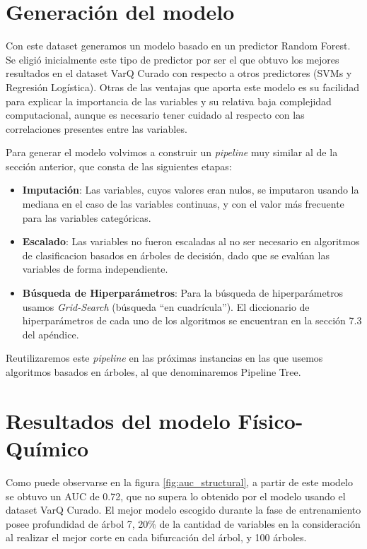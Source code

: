 

\section{Generación del modelo}

Con este dataset generamos un modelo basado en un predictor Random Forest. 
Se eligió inicialmente este tipo de predictor por ser el que obtuvo los mejores resultados en el dataset VarQ Curado con respecto a otros predictores (SVMs y Regresión Logística). Otras de las ventajas que aporta este modelo es su facilidad para explicar la importancia de las variables y su relativa baja complejidad computacional, aunque es necesario tener cuidado al respecto con las correlaciones presentes entre las variables.

Para generar el modelo volvimos a construir un \textit{pipeline} muy similar al de la sección anterior, que consta de las siguientes etapas:

\begin{itemize}
 
\item \textbf{Imputación}: Las variables, cuyos valores eran nulos, se imputaron usando la mediana en el caso de las variables continuas, y con el valor más frecuente para las variables categóricas. 
\item \textbf{Escalado}: Las variables no fueron escaladas al no ser necesario en algoritmos de clasificacion basados en árboles de decisión, dado que se evalúan las variables de forma independiente. 
\item \textbf{Búsqueda de Hiperparámetros}: Para la búsqueda de hiperparámetros usamos \textit{Grid-Search} (búsqueda ``en cuadrícula''). El diccionario de hiperparámetros de cada uno de los algoritmos se encuentran en la sección 7.3 del apéndice.
\end{itemize}

Reutilizaremos este \textit{pipeline} en las próximas instancias en las que usemos algoritmos basados en árboles, al que denominaremos Pipeline Tree. 

\section{Resultados del modelo Físico-Químico}

Como puede observarse en la figura \ref{fig:auc_structural}, a partir de este modelo se obtuvo un AUC de 0.72, que no supera lo obtenido por el modelo usando el dataset VarQ Curado. El mejor modelo escogido durante la fase de entrenamiento posee profundidad de árbol 7, 20\% de la cantidad de variables en la consideración al realizar el mejor corte en cada bifurcación del árbol, y 100 árboles. 


